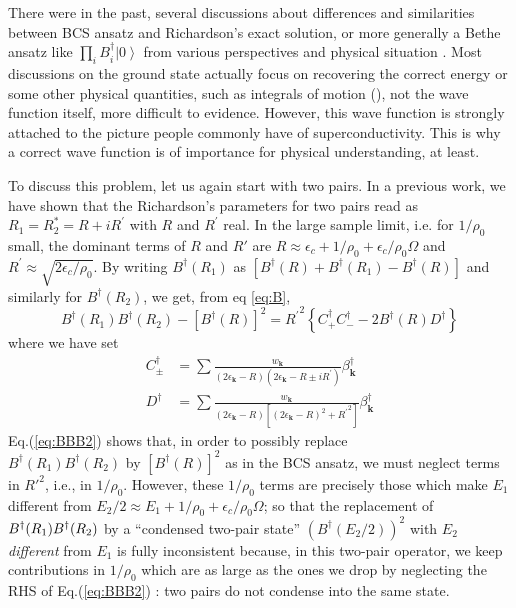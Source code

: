 \documentclass[epj]{svjour}
\newcommand{\vk}{\ensuremath{\mathbf{k}}}
\begin{document}
There were in the past, several discussions about differences and similarities between BCS ansatz and Richardson's exact solution, or more generally a Bethe ansatz like $\prod_iB^\dagger_i\left|0\right>$ from various perspectives and physical situation \cite{bang,hasegawa,Roman2002}.  Most discussions on the ground state actually  focus on recovering the correct energy or some other physical quantities, such as integrals of motion (\cite{ortiz}), not the wave function itself, more difficult to evidence. However, this wave function is strongly attached to the picture people commonly have of superconductivity. This is why a correct wave function is of importance for physical understanding, at least.

To discuss this problem, let us again start with two pairs. In
a previous work\cite{combescotBCS}, we have shown that the Richardson's parameters for two pairs read as $R_1=R_{2}^{*}=R+iR^{\prime}$ with $R$
and $R^{\prime}$ real. In the
large sample limit, i.e. for $1/\rho_0$ small,  the dominant terms of $R$ and $R'$ are $R\approx\epsilon_c+1/%
\rho_0+\epsilon_c/\rho_0\Omega$ and $R^{\prime}\approx\sqrt{2\epsilon_c/\rho_0}$. By writing $B^{\dagger}(R_1)$ as $\left[B^{\dagger}(R)+B^{\dagger}(R_1)-B^{\dagger}(R)\right]$ and similarly for  $B^{\dagger}(R_2)$, 
we get, from eq \eqref{eq:B}, 
\begin{equation}\label{eq:BBB2}
B^{\dagger}(R_1)B^{\dagger}(R_2)-\left[B^{\dagger}(R)\right]
^2={R^{\prime}}^2\left\{C^{\dagger}_+C^{\dagger}_--2B^{\dagger}(R)D^{\dagger}%
\right\} 
\end{equation}
where we have set 
\begin{align}
C^{\dagger}_{\pm}&=\sum\frac{w_\vk}{\left(2\epsilon_\vk-R\right)
\left(2\epsilon_\vk-R\pm{}iR^{\prime}\right) }\beta^{\dagger}_\vk \\
D^{\dagger}&=\sum\frac{w_\vk}{\left(2\epsilon_\vk-R\right) \left[%
\left(2\epsilon_\vk-R\right) ^2+{}{R^{\prime}}^2\right] }\beta^{\dagger}_\vk
\end{align}
Eq.(\ref{eq:BBB2}) shows that, in order to possibly replace \\$B^{\dagger}(R_1)B^{\dagger}(R_2)$ by $\left[B^{\dagger}(R)\right]
^2$ as in the BCS ansatz, we must neglect terms in $R'^2$, i.e., in $1/\rho_0$. However, these $1/\rho_0$ terms are precisely those which make $E _1$ different from $E _2/2\approx E_1+1/\rho_0+\epsilon_c/\rho_0\Omega$; so that the replacement of $B^{\dagger}(R_1)B^{%
\dagger}(R_2)$ by a ``condensed two-pair state'' $\left(B^{\dagger}(E _2/2)\right) ^2$ with $E_2$ \emph{different }from $E_1$ is fully inconsistent because, in this two-pair
operator, we keep contributions in $1/\rho_0$ which are as large as the ones we drop
by neglecting the RHS of Eq.(\ref{eq:BBB2}) : two pairs do not condense into the same state.
\end{document}
